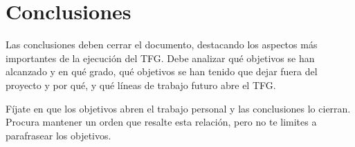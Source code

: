 \chapter{Conclusiones}
\label{ch:conclusiones}

Las conclusiones deben cerrar el documento, destacando los aspectos más importantes de la ejecución del TFG.  Debe analizar qué objetivos se han alcanzado y en qué grado, qué objetivos se han tenido que dejar fuera del proyecto y por qué, y qué líneas de trabajo futuro abre el TFG. 

Fíjate en que los objetivos abren el trabajo personal y las conclusiones lo cierran.  Procura mantener un orden que resalte esta relación, pero no te limites a parafrasear los objetivos.
